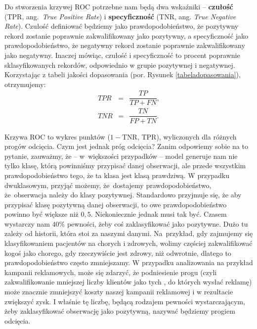 \documentclass{mini}
\begin{document}
Do stworzenia krzywej ROC potrzebne nam będą dwa wskaźniki -- \textbf{czułość} (TPR, ang.~\textit{True Positive Rate}) i \textbf{specyficzność} (TNR, ang. \textit{True Negative Rate}). Czułość definiować będziemy jako prawdopodobieństwo, że pozytywny rekord zostanie poprawnie zakwalifikowany jako pozytywny, a specyficzność jako prawdopodobieństwo, że negatywny rekord zostanie poprawnie zakwalifikowany jako negatywny. Inaczej mówiąc, czułość i specyficzność to procent poprawnie sklasyfikowanych rekordów, odpowiednio w grupie pozytywnej i negatywnej. Korzystając z tabeli jakości dopasowania (por. Rysunek \ref{tabeladopasowania}), otrzymujemy:
\begin{eqnarray*}
	TPR&=&\dfrac{TP}{TP+FN},\\
	TNR&=&\dfrac{TN}{FP+TN}.		
\end{eqnarray*}  

Krzywa ROC to wykres punktów ($1-$TNR, TPR), wyliczonych dla różnych progów odcięcia. Czym jest jednak próg odcięcia? Zanim odpowiemy sobie na to pytanie, zauważmy, że -- w~większości przypadków -- model generuje nam nie tylko klasę, którą powinniśmy przypisać danej obserwacji, ale przede wszystkim prawdopodobieństwo tego, że ta klasa jest klasą prawdziwą. W przypadku dwuklasowym, przyjąć możemy, że~dostajemy prawdopodobieństwo, że~obserwacja należy do klasy pozytywnej. Standardowo przyjmuje się, że aby przypisać klasę pozytywną danej obserwacji, to owe prawdopodobieństwo powinno być większe niż $0,5$. Niekoniecznie jednak musi tak być. Czasem wystarczy nam $40\%$ pewności, żeby coś zaklasyfikować jako pozytywne. Dużo tu zależy od historii, która stoi za naszymi danymi. Na~przykład, gdy zajmujemy się klasyfikowaniem pacjentów na chorych i zdrowych, wolimy częściej zakwalifikować kogoś jako chorego, gdy rzeczywiście jest zdrowy, niż odwrotnie, dlatego to prawdopodobieństwo często zmniejszamy. W przypadku analizowania na przykład kampanii reklamowych, może się zdarzyć, że podniesienie progu (czyli zakwalifikowanie mniejszej liczby klientów jako tych , do których wysłać reklamę) może znacznie zmniejszyć koszty naszej kampanii reklamowej i w rezultacie zwiększyć zysk. I właśnie tę liczbę, będącą rodzajem pewności wystarczającym, żeby zaklasyfikować obserwację jako pozytywną, nazywać będziemy progiem odcięcia. 
\end{document}
